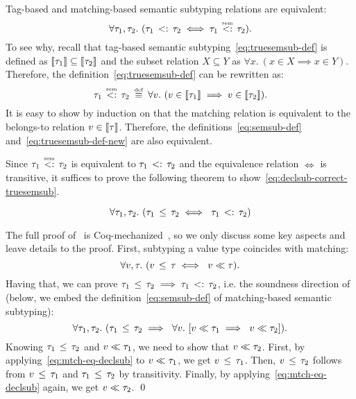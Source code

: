 Tag-based and matching-based semantic subtyping relations 
are equivalent:
\[
\forall \ty_1, \ty_2.\ 
(\bjsemsub{\ty_1}{\ty_2} \iff \bjtruesemsub{\ty_1}{\ty_2}).
\]
To see why, recall that tag-based semantic subtyping~\eqref{eq:truesemsub-def} 
is defined as $\llbracket \tau_1 \rrbracket \subseteq \llbracket \tau_2 \rrbracket$
and the subset relation $X \subseteq Y$ as
$\forall x.\ (x \in X \implies x \in Y)$.
Therefore, the definition~\eqref{eq:truesemsub-def} can be 
rewritten as:
\begin{equation}\label{eq:truesemsub-def-new}
\bjtruesemsub{\ty_1}{\ty_2} \;\defsign \;
\forall \vty.\ (\vty \in \interpty{\ty_1} \implies \vty \in \interpty{\ty_2}).
\end{equation}
It is easy to show by induction on \ty that the matching relation
is equivalent to the belongs-to relation $v \in \llbracket \tau \rrbracket$. 
Therefore, the definitions~\eqref{eq:semsub-def}
and~\eqref{eq:truesemsub-def-new} are also equivalent.

Since $\bjtruesemsub{\ty_1}{\ty_2}$ is equivalent to $\tau_1 \, <: \, \tau_2$
and the equivalence relation $\iff$ is transitive,
it suffices to prove the following theorem
to show~\eqref{eq:declsub-correct-truesemsub}.

\begin{theorem}\label{thm:declsub-correct}
	\[
	\forall \tau_1, \tau_2.\ (\tau_1 \, \leq \, \tau_2 \iff\ \tau_1 \, <: \, \tau_2)
	\]
\end{theorem}

The full proof of~ is 
Coq-mechanized~\cite{bib:MiniJlCoq},
so we only discuss some key aspects and leave details to the proof.
First, subtyping a value type coincides with matching:
\begin{equation}\label{eq:mtch-eq-declsub}
\forall v, \tau.\ (v \, \leq \, \tau \iff\ v \ll \tau).
\end{equation}
Having that, we can prove 
$\tau_1 \, \leq \, \tau_2 \implies \tau_1 \, <: \, \tau_2$,
i.e. the soundness direction of~
(below, we embed the definition~\eqref{eq:semsub-def} of 
matching-based semantic subtyping):
\begin{equation}\label{eq:declsub-imp-semsub}
\forall \ty_1, \ty_2.\ 
(\bjsub{\ty_1}{\ty_2} \implies\ 
\forall \vty.\ [\bjmtch{\vty}{\ty_1} \implies\ \bjmtch{\vty}{\ty_2}]).
\end{equation}
Knowing $\tau_1 \, \leq \, \tau_2$ and $v \ll \tau_1$,
we need to show that $v \ll \tau_2$.
First, by applying~\eqref{eq:mtch-eq-declsub} to $v \ll \tau_1$,
we get $v \, \leq \, \tau_1$.
Then, $v \, \leq \, \tau_2$ follows from $v \, \leq \, \tau_1$ 
and $\tau_1 \, \leq \, \tau_2$ by transitivity.
Finally, by applying~\eqref{eq:mtch-eq-declsub} again,
we get $v \ll \tau_2$. \qed

